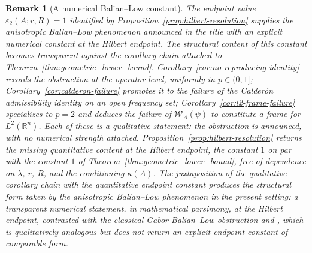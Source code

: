 \documentclass[pdflatex,sn-basic,Numbered]{sn-jnl}
\theoremstyle{thmstyleone}%
\theoremstyle{thmstylethree}%
\newtheorem{remark}{Remark}%
\begin{document}
\begin{remark}[A numerical Balian--Low constant]\label{rem:bl-constant}
	The endpoint value $\varepsilon_2(A; r, R) = 1$ identified by
	Proposition~\ref{prop:hilbert-resolution} supplies the anisotropic
	Balian--Low phenomenon announced in the title with an explicit
	numerical constant at the Hilbert endpoint. The structural
	content of this constant becomes transparent against the
	corollary chain attached to
	Theorem~\ref{thm:geometric_lower_bound}. Corollary~\ref{cor:no-reproducing-identity}
	records the obstruction at the operator level, uniformly in
	$p \in (0, 1]$; Corollary~\ref{cor:calderon-failure} promotes it
	to the failure of the Calder\'on admissibility identity on an
	open frequency set; Corollary~\ref{cor:l2-frame-failure}
	specializes to $p = 2$ and deduces the failure of
	$\mathcal{W}_A(\psi)$ to constitute a frame for
	$L^2(\mathbb{R}^n)$. Each of these is a qualitative statement: the
	obstruction is announced, with no numerical strength attached.
	Proposition~\ref{prop:hilbert-resolution} returns the missing
	quantitative content at the Hilbert endpoint, the constant $1$ on
	par with the constant $1$ of
	Theorem~\ref{thm:geometric_lower_bound}, free of dependence on
	$\lambda$, $r$, $R$, and the conditioning $\kappa(A)$. The
	juxtaposition of the qualitative corollary chain with the
	quantitative endpoint constant produces the structural form taken
	by the anisotropic Balian--Low phenomenon in the present setting:
	a transparent numerical statement, in mathematical parsimony, at
	the Hilbert endpoint, contrasted with the classical Gabor
	Balian--Low obstruction
	\cite[Theorem~4.1.1]{Daubechies1992} and \cite[Section~8.4]{Karlheinz2001}, which is qualitatively analogous
	but does not return an explicit endpoint constant of comparable
	form.
\end{remark}
\end{document}
